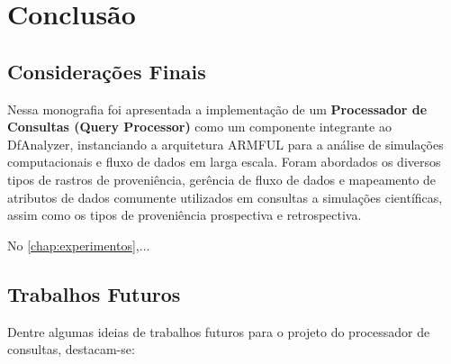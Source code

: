 
\chapter{Conclusão}%
\label{chap:conclusao}

\section{Considerações Finais}

Nessa monografia foi apresentada a implementação de um \textbf{Processador de Consultas (Query Processor)} como um componente integrante ao DfAnalyzer, instanciando a arquitetura ARMFUL para a análise de simulações computacionais e fluxo de dados em larga escala. Foram abordados os diversos tipos de rastros de proveniência, gerência de fluxo de dados e mapeamento de atributos de dados comumente utilizados em consultas a simulações científicas, assim como os tipos de proveniência prospectiva e retrospectiva.

No \autoref{chap:experimentos},...


\section{Trabalhos Futuros}

Dentre algumas ideias de trabalhos futuros para o projeto do processador de consultas, destacam-se:

